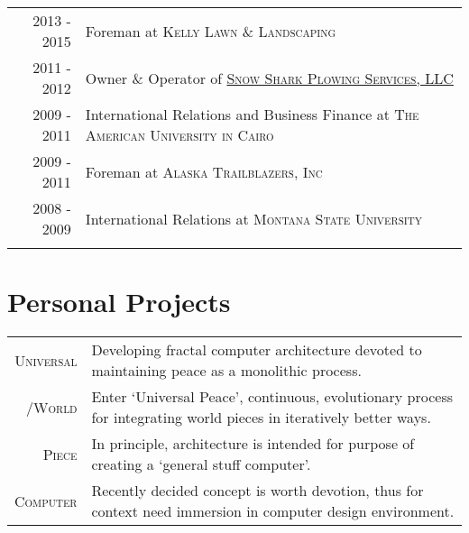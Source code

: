 \documentclass[letter,11pt]{article}
\begin{document}
\begin{center}
{\begin{tabular}{r|l}
\addlinespace[8pt]

		\textsc{2013 - 2015}
	&	Foreman at \textsc{Kelly Lawn \& Landscaping}
	\\
	
\addlinespace[8pt]

		\textsc{2011 - 2012}
	&	Owner \& Operator of 
		\href{https://github.com/blairmunroakusa/portfolio/tree/master/miscellaneous/snowshark}
		{\textsc{Snow Shark Plowing Services, LLC}}
	\\

\addlinespace[8pt]

		\textsc{2009 - 2011}
	&	International Relations and Business Finance at \textsc{The American University in Cairo}
	\\

\addlinespace[8pt]

		\textsc{2009 - 2011}
	&	Foreman at 
		\textsc{Alaska Trailblazers, Inc}
	\\
	
\addlinespace[8pt]

		\textsc{2008 - 2009}
	&	International Relations at \textsc{Montana State University}
	\\
	
\addlinespace[10pt]

\end{tabular}

\section{Personal Projects}


\begin{tabular}{r|l}

\addlinespace[8pt]

		\hspace{13.8pt}\textsc{Universal}
	&	\scriptsize{Developing fractal computer architecture devoted to maintaining peace as a monolithic process.}
	\\
		\textsc{/World}
	&	\scriptsize{Enter `Universal Peace', continuous, evolutionary process for integrating world pieces in iteratively better ways.}
	\\
		\textsc{Piece}
	&	\scriptsize{In principle, architecture is intended for purpose of creating a `general stuff computer'.}
	\\
		\textsc{Computer}
	&	\scriptsize{Recently decided concept is worth devotion, thus for context need immersion in computer design environment.}
	\\
	

\end{tabular}}
\end{center}
\end{document}
